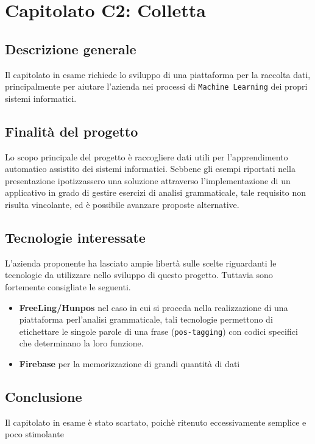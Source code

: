 \chapter{Capitolato C2: Colletta}
\section{Descrizione generale}
Il capitolato in esame richiede lo sviluppo di una piattaforma per la raccolta dati, principalmente per aiutare l'azienda nei processi di \texttt{Machine Learning} dei propri sistemi informatici.

\section{Finalit\`a del progetto}
Lo scopo principale del progetto è raccogliere dati utili per l'apprendimento automatico assistito dei sistemi informatici. Sebbene gli esempi riportati nella presentazione ipotizzassero una soluzione attraverso l'implementazione di un applicativo in grado di gestire esercizi di analisi grammaticale, tale requisito non risulta vincolante, ed è possibile avanzare proposte alternative.

\section{Tecnologie interessate}
L'azienda proponente ha lasciato ampie libertà sulle scelte riguardanti le tecnologie da utilizzare nello sviluppo di questo progetto. Tuttavia sono fortemente consigliate le seguenti.
\begin{itemize}
	\item \textbf{FreeLing/Hunpos} nel caso in cui si proceda nella realizzazione di una piattaforma perl'analisi grammaticale, tali tecnologie permettono di etichettare le singole parole di una frase (\texttt{pos-tagging}) con codici specifici che determinano la loro funzione.
	\item \textbf{Firebase} per la memorizzazione di grandi quantità di dati
\end{itemize}
\section{Conclusione}
Il capitolato in esame è stato scartato, poichè ritenuto eccessivamente semplice e poco stimolante